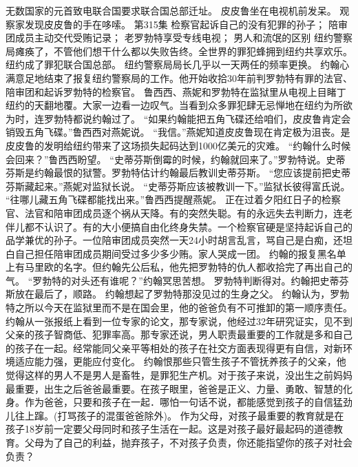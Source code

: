 \documentclass[a4paper,12pt,UTF8,twoside]{ctexbook}
\begin{document}
        无数国家的元首致电联合国要求联合国总部迁址。  
        皮皮鲁坐在电视机前发呆。  
        观察家发现皮皮鲁的手在哆嗦。          第315集  
        检察官起诉自己的没有犯罪的孙子；  
        陪审团成员主动交代受贿记录；  
        老罗勃特享受专线电视；  
        男人和流氓的区别    
        纽约警察局瘫痪了，不管他们想干什么都以失败告终。全世界的罪犯蜂拥到纽约共享欢乐。纽约成了罪犯联合国总部。  
        纽约警察局局长几乎以一天两任的频率更换。  
        约翰心满意足地结束了报复纽约警察局的工作。他开始收拾30年前判罗勃特有罪的法官、陪审团和起诉罗勃特的检察官。  
        鲁西西、燕妮和罗勃特在监狱里从电视上目睹丁纽约的天翻地覆。大家一边看一边叹气。当看到众多罪犯肆无忌惮地在纽约为所欲为时，连罗勃特都说约翰过了。        
        “如果约翰能把五角飞碟还给咱们，皮皮鲁肯定会销毁五角飞碟。”鲁西西对燕妮说。  
        “我信。”燕妮知道皮皮鲁现在肯定极为沮丧。是皮皮鲁的发明给纽约带来了这场损失起码达到1000亿美元的灾难。  
        “约翰什么时候会回来？”鲁西西盼望。  
        “史蒂芬斯倒霉的时候，约翰就回来了。”罗勃特说。史蒂芬斯是约翰最恨的狱警。罗勃特估计约翰最后教训史蒂芬斯。  
        “您应该提前把史蒂芬斯藏起来。”燕妮对监狱长说。  
        “史蒂芬斯应该被教训一下。”监狱长彼得富氏说。  
        “往哪儿藏五角飞碟都能找出来。”鲁西西提醒燕妮。  
        正在过着夕阳红日子的检察官、法官和陪审团成员逐个祸从天降。有的突然失聪。有的永远失去判断力，连老伴儿都不认识了。有的大小便搞自由化终身失禁。一个检察官硬是坚持起诉自己的品学兼优的孙子。一位陪审团成员突然一天24小时胡言乱言，骂自己是白痴，还坦白自己担任陪审团成员期间受过多少多少贿。家人哭成一团。  
        约翰的报复黑名单上有马里欧的名字。但约翰先公后私，他先把罗勃特的仇人都收拾完了再出自己的气。  
        “罗勃特的对头还有谁呢？”约翰冥思苦想。  
        罗勃特判断得对。约翰把史蒂芬斯放在最后了，顺路。  
        约翰想起了罗勃特那没见过的生身之父。  
        约翰认为，罗勃特之所以今天在监狱里而不是在国会里，他的爸爸负有不可推卸的第一顺序责任。  
        约翰从一张报纸上看到一位专家的论文，那专家说，他经过32年研究证实，见不到父亲的孩子智商低、犯罪率高。那专家还说，男人职责最重要的工作就是多和自己的孩子在一起。经常能同父亲平等相处的孩子在社交方面表现得更有自信，对新环境适应能力强，更能应付变化。  
        约翰恨那些只管生孩子不管抚养孩子的父亲，他觉得这样的男人不是男人是畜牲，是罪犯生产机。对于孩子来说，没出生之前妈妈最重要，出生之后爸爸最重要。在孩子眼里，爸爸是正义、力量、勇敢、智慧的化身。作为爸爸，只要和孩子在一起．哪怕一句话不说，都能感觉到孩子的自信猛劲儿往上蹿。(打骂孩子的混蛋爸爸除外)。  
        作为父母，对孩子最重要的教育就是在孩子18岁前一定要父母同时和孩子生活在一起。这是对孩子最好最起码的道德教育。父母为了自己的利益，抛弃孩子，不对孩子负责，你还能指望你的孩子对社会负责？  
\end{document}

